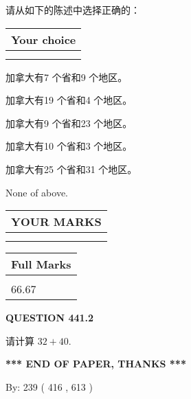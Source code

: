 \documentclass{ctexart}
\begin{document}
  
请从如下的陈述中选择正确的：
  
  
\noindent\hspace{3.0in} \begin{tabular}{|l|}
\hline
Your choice \\
\hline
 \\ 
 \\ 
\hline
\end{tabular}
  
  
 
 
加拿大有7 个省和9 个地区。
 
 
加拿大有19 个省和4 个地区。
 
 
加拿大有9 个省和23 个地区。
 
 
加拿大有10 个省和3 个地区。
 
 
加拿大有25 个省和31 个地区。
 
 
 None of above.
 
 
  
\vspace{0.2in}
  
\noindent\begin{tabular}{|l|}
\hline
 YOUR MARKS  \\
\hline
 \\ 
 \\ 
\hline
\end{tabular}
\hspace{0.05in} \begin{tabular}{|l|}
\hline
 Full Marks  \\
\hline
 \\ 
66.67 \\
\hline
\end{tabular}
{\textbf{\Large{QUESTION
441.2 
}}}
  
  
 
请计算 $ %
32 +  %
40 $.
 

 

 
   
   
 \vspace{0.2in}
 
   
   
   
   
\vspace{1.0in} 
{\textbf{\large{ *** END OF PAPER, THANKS *** }}} 
   
   
\hspace{1.0in} By: 
 239 ( 416 ,  613 )
   
\end{document}

